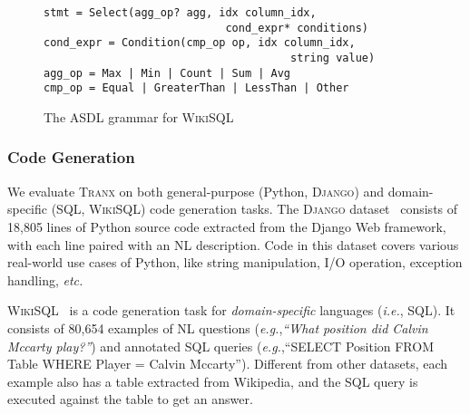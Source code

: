 \documentclass[11pt,a4paper]{article}
\renewcommand{\tt}[1]{\fontfamily{cmtt}\selectfont #1}
\newcommand{\ie}{{\emph{i.e.}},\xspace}
\newcommand{\eg}{{\emph{e.g.}},\xspace}
\newcommand{\etc}{\emph{etc.}\xspace}
\def\model/{\textsc{Tranx}}
\def\django/{\textsc{Django}}
\def\wikisql/{\textsc{WikiSQL}}
\begin{document}
\begin{figure}[t]
  \centering
\begin{lstlisting}[basicstyle=\fontfamily{cmtt}\small,columns=fullflexible,frame=bt]
stmt = Select(agg_op? agg, idx column_idx, 
                            cond_expr* conditions)
cond_expr = Condition(cmp_op op, idx column_idx, 
                                      string value)
agg_op = Max | Min | Count | Sum | Avg
cmp_op = Equal | GreaterThan | LessThan | Other
\end{lstlisting}
  \vspace{-2mm}
  \caption{The ASDL grammar for \wikisql/}
  \label{fig:asdl_wikisql}
  \vspace{-3mm}
\end{figure}

\vspace{-1mm}
\subsubsection{Code Generation}
\vspace{-1mm}

We evaluate \model/ on both general-purpose (Python, \django/) and domain-specific (SQL, \wikisql/) code generation tasks.
The \django/ dataset~\citep{DBLP:conf/kbse/OdaFNHSTN15} consists of 18,805 lines of Python source code extracted from the Django Web framework, with each line paired with an NL description. 
Code in this dataset covers various real-world use cases of Python, like string manipulation, I/O operation, exception handling, \etc

\wikisql/~\citep{DBLP:journals/corr/abs-1709-00103} is a code generation task for \emph{domain-specific} languages (\ie SQL). It consists of 80,654 examples of NL questions (\eg \textit{``What position did Calvin Mccarty play?''}) and annotated SQL queries (\eg ``{\tt SELECT Position FROM Table WHERE Player = Calvin Mccarty}''). Different from other datasets, each example also has a table extracted from Wikipedia, and the SQL query is executed against the table to get an answer.
\end{document}

